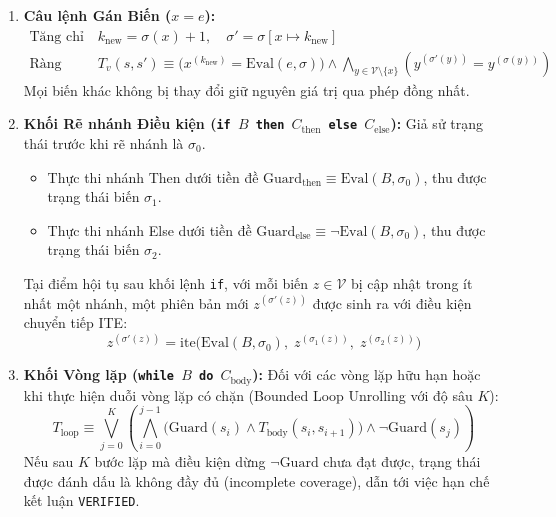\begin{enumerate}
    \item \textbf{Câu lệnh Gán Biến ($x = e$):}
    \begin{align}
    \text{Tăng chỉ số:} \quad & k_{\text{new}} = \sigma(x) + 1, \quad \sigma' = \sigma[x \mapsto k_{\text{new}}] \\
    \text{Ràng buộc chuyển tiếp:} \quad & T_v(s, s') \equiv \Big( x^{(k_{\text{new}})} = \text{Eval}(e, \sigma) \Big) \land \bigwedge_{y \in \mathcal{V} \setminus \{x\}} (y^{(\sigma'(y))} = y^{(\sigma(y))})
    \end{align}
    Mọi biến khác không bị thay đổi giữ nguyên giá trị qua phép đồng nhất.

    \item \textbf{Khối Rẽ nhánh Điều kiện (\texttt{if $B$ then $C_{\text{then}}$ else $C_{\text{else}}$}):}
    Giả sử trạng thái trước khi rẽ nhánh là $\sigma_0$.
    \begin{itemize}
        \item Thực thi nhánh Then dưới tiền đề $\text{Guard}_{\text{then}} \equiv \text{Eval}(B, \sigma_0)$, thu được trạng thái biến $\sigma_1$.
        \item Thực thi nhánh Else dưới tiền đề $\text{Guard}_{\text{else}} \equiv \neg \text{Eval}(B, \sigma_0)$, thu được trạng thái biến $\sigma_2$.
    \end{itemize}
    Tại điểm hội tụ sau khối lệnh \texttt{if}, với mỗi biến $z \in \mathcal{V}$ bị cập nhật trong ít nhất một nhánh, một phiên bản mới $z^{(\sigma'(z))}$ được sinh ra với điều kiện chuyển tiếp ITE:
    \begin{equation}
    z^{(\sigma'(z))} = \text{ite}\Big(\text{Eval}(B, \sigma_0), \; z^{(\sigma_1(z))}, \; z^{(\sigma_2(z))}\Big)
    \end{equation}

    \item \textbf{Khối Vòng lặp (\texttt{while $B$ do $C_{\text{body}}$}):}
    Đối với các vòng lặp hữu hạn hoặc khi thực hiện duỗi vòng lặp có chặn (Bounded Loop Unrolling với độ sâu $K$):
    \begin{equation}
    T_{\text{loop}} \equiv \bigvee_{j=0}^{K} \left( \bigwedge_{i=0}^{j-1} \Big( \text{Guard}(s_i) \land T_{\text{body}}(s_i, s_{i+1}) \Big) \land \neg \text{Guard}(s_j) \right)
    \end{equation}
    Nếu sau $K$ bước lặp mà điều kiện dừng $\neg \text{Guard}$ chưa đạt được, trạng thái được đánh dấu là không đầy đủ (incomplete coverage), dẫn tới việc hạn chế kết luận \texttt{VERIFIED}.
\end{enumerate}

